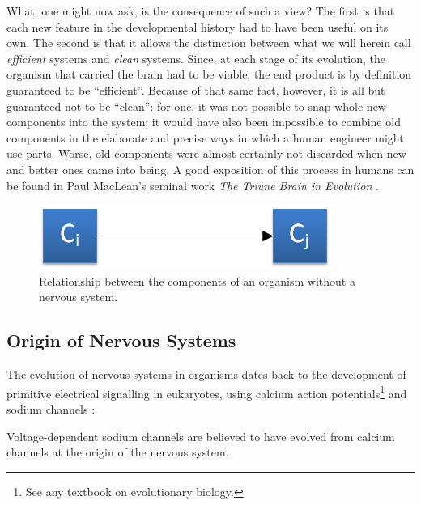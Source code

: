 What, one might now ask, is the consequence of such a view? The first is that each new feature in the developmental history had to have been useful on its own. The second is that it allows the distinction between what we will herein call \emph{efficient} systems and \emph{clean} systems. Since, at each stage of its evolution, the organism that carried the brain had to be viable, the end product is by definition guaranteed to be ``efficient''. Because of that same fact, however, it is all but guaranteed not to be ``clean'': for one, it was not possible to snap whole new components into the system; it would have also been impossible to combine old components in the elaborate and precise ways in which a human engineer might use parts. Worse, old components were almost certainly not discarded when new and better ones came into being. A good exposition of this process in humans can be found in Paul MacLean's seminal work {\em The Triune Brain in Evolution} \cite{maclean1990}.

\begin{figure}[!h]
	\centering
	\includegraphics{Figs/noNervousSystem.png}
	\caption{Relationship between the components of an organism without a nervous system.}
	\label{fig:noNervousSystem}
\end{figure}
\subsection{Origin of Nervous Systems} The evolution of nervous systems in organisms dates back to the development of primitive electrical signalling in eukaryotes, using calcium action potentials\footnote{See any textbook on evolutionary biology.} and sodium channels \cite{Liebeskind31052011}:

\begin{emquote}
	Voltage-dependent sodium channels are believed to have evolved from calcium channels at the origin of the nervous system.
\end{emquote}

